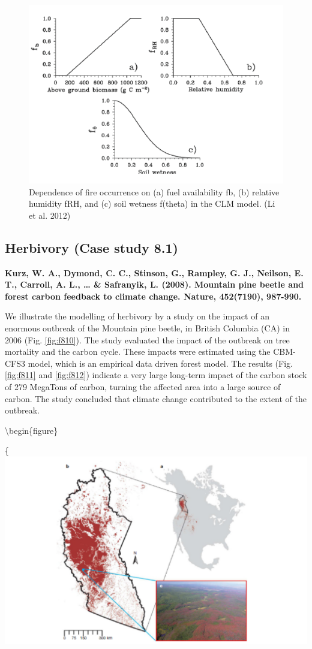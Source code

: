 \documentclass[12pt,oneside]{book}
\begin{document}
\begin{figure}

{\centering \includegraphics[width=0.8\linewidth]{figures/chap8/f89_CLM_fire_relations} 

}

\caption{Dependence of fire occurrence on (a) fuel availability fb, (b) relative humidity fRH, and (c) soil wetness f(theta) in the CLM model. (Li et al. 2012)}\label{fig:f89}
\end{figure}

\subsection{Herbivory (Case study 8.1)}\label{herbivory-case-study-8.1}

\textbf{Kurz, W. A., Dymond, C. C., Stinson, G., Rampley, G. J.,
Neilson, E. T., Carroll, A. L., \ldots{} \& Safranyik, L. (2008).
Mountain pine beetle and forest carbon feedback to climate change.
Nature, 452(7190), 987-990.}

We illustrate the modelling of herbivory by a study on the impact of an
enormous outbreak of the Mountain pine beetle, in British Columbia (CA)
in 2006 (Fig. \ref{fig:f810}). The study evaluated the impact of the
outbreak on tree mortality and the carbon cycle. These impacts were
estimated using the CBM-CFS3 model, which is an empirical data driven
forest model. The results (Fig. \ref{fig:f811} and \ref{fig:f812})
indicate a very large long-term impact of the carbon stock of 279
MegaTons of carbon, turning the affected area into a large source of
carbon. The study concluded that climate change contributed to the
extent of the outbreak.

\textbackslash{}begin\{figure\}

\{\centering \includegraphics[width=0.8\linewidth]{figures/chap8/f810_Kurz1}
\end{document}
